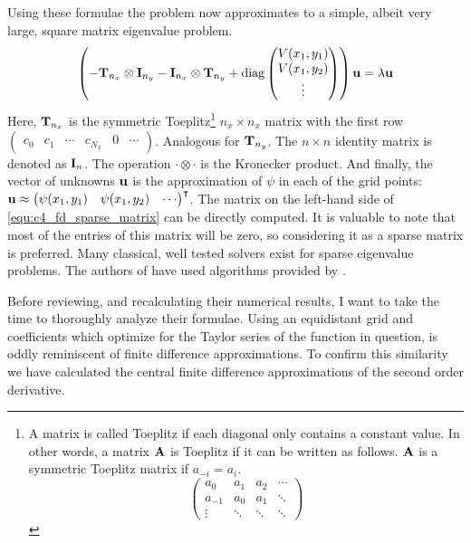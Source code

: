 Using these formulae the problem now approximates to a simple, albeit very large, square matrix eigenvalue problem.
\begin{equation}\label{equ:c4_fd_sparse_matrix}
    \left(-\vb{T}_{n_x} \otimes \vb{I}_{n_y} - \vb{I}_{n_x} \otimes \vb{T}_{n_y} +  \operatorname{diag}\begin{pmatrix}V(x_1, y_1) \\ V(x_1, y_2) \\ \vdots \end{pmatrix} \right)\vb{u} = \lambda \vb{u}
\end{equation}
Here, $\vb{T}_{n_x}$ is the symmetric Toeplitz\footnote{A matrix is called Toeplitz if each diagonal only contains a constant value. In other words, a matrix $\vb{A}$ is Toeplitz if it can be written as follows. $\vb{A}$ is a symmetric Toeplitz matrix if $a_{-i} = a_i$. $$\begin{pmatrix} a_0 & a_1 & a_2 & \cdots \\ a_{-1} & a_0 & a_1 & \ddots \\ \vdots & \ddots & \ddots & \ddots \end{pmatrix}$$} $n_x \times n_x$ matrix with the first row $\begin{pmatrix} c_0 & c_1 & \cdots & c_{N_x} & 0 & \cdots \end{pmatrix}$. Analogous for $\vb{T}_{n_y}$. The $n\times n$ identity matrix is denoted as $\vb{I}_n$. The operation $\cdot \otimes \cdot$ is the Kronecker product. And finally, the vector of unknowns $\vb{u}$ is the approximation of $\psi$ in each of the grid points: $\vb{u} \approx {\begin{pmatrix} \psi(x_1, y_1) & \psi(x_1, y_2) & \cdots \end{pmatrix}}^\intercal$. The matrix on the left-hand side of \eqref{equ:c4_fd_sparse_matrix} can be directly computed. It is valuable to note that most of the entries of this matrix will be zero, so considering it as a sparse matrix is preferred. Many classical, well tested solvers exist for sparse eigenvalue problems. The authors of \cite{wang_new_2009} have used algorithms provided by \mathematica{} \cite{Mathematica}.

Before reviewing, and recalculating their numerical results, I want to take the time to thoroughly analyze their formulae. Using an equidistant grid and coefficients which optimize for the Taylor series of the function in question, is oddly reminiscent of finite difference approximations. To confirm this similarity we have calculated the central finite difference approximations of the second order derivative.

